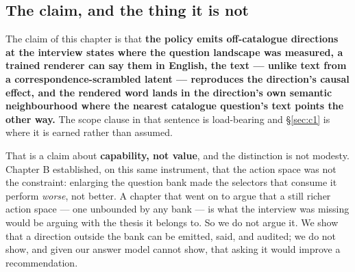 \documentclass[11pt]{article}
\begin{document}
\subsection{The claim, and the thing it is not}

The claim of this chapter is that \textbf{the policy emits off-catalogue directions at the interview
states where the question landscape was measured, a trained renderer can say them in English, the
text --- unlike text from a correspondence-scrambled latent --- reproduces the direction's causal
effect, and the rendered word lands in the direction's own semantic neighbourhood where the nearest
catalogue question's text points the other way.} The scope clause in that sentence is load-bearing
and \S\ref{sec:c1} is where it is earned rather than assumed.

That is a claim about \textbf{capability, not value}, and the distinction is not modesty. Chapter B
established, on this same instrument, that the action space was not the constraint: enlarging the
question bank made the selectors that consume it perform \emph{worse}, not better. A chapter that
went on to argue that a still richer action space --- one unbounded by any bank --- is what the
interview was missing would be arguing with the thesis it belongs to. So we do not argue it. We show
that a direction outside the bank can be emitted, said, and audited; we do not show, and given our
answer model cannot show, that asking it would improve a recommendation.
\end{document}
